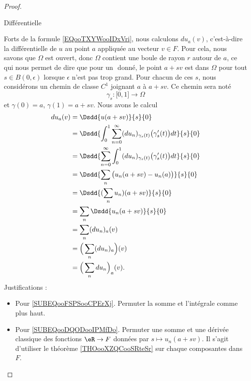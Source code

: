 \begin{proof}
\begin{subproof}
        \item[Différentielle]
        
            Forts de la formule \eqref{EQooTXYWooIDxVri}, nous calculons \( du_a(v)\), c'est-à-dire la différentielle de \( u\) au point \( a\) appliquée au vecteur \( v\in F\). Pour cela, nous savons que \( \Omega\) est ouvert, donc \( \Omega\) contient une boule de rayon \( r\) autour de \( a\), ce qui nous permet de dire que pour un \( \) donné, le point \( a+sv\) est dans \( \Omega\) pour tout \( s\in B(0,\epsilon)\) lorsque \( \epsilon\) n'est pas trop grand. Pour chacun de ces \( s\), nous considérons un chemin de classe \( C^1\) joignant \( a\) à \( a+sv\). Ce chemin sera noté
            \begin{equation}
                \gamma_s\colon \mathopen[ 0 , 1 \mathclose]\to \Omega
            \end{equation}
            et \( \gamma(0)=a\), \( \gamma(1)=a+sv\). Nous avons le calcul
            \begin{subequations}
                \begin{align}
                    du_a(v)&=\Dsdd{ u(a+sv) }{s}{0}\\
                    &=\Dsdd{ \int_0^1\sum_{n=0}^{\infty}(du_n)_{\gamma_s(t)}\big( \gamma_s'(t) \big)dt }{s}{0}\\
                    &=\Dsdd{ \sum_{n=0}^{\infty} \int_0^1(du_n)_{\gamma_s(t)}\big( \gamma'_s(t) \big)dt  }{s}{0}    \label{SUBEQooFSPSooCPErXj}\\
                    &=\Dsdd{ \sum_n\big( u_n(a+sv)-u_n(a) \big) }{s}{0}\\
                    &=\Dsdd{ (\sum_nu_n)(a+sv) }{s}{0}\\
                    &=\sum_n\Dsdd{ u_n(a+sv) }{s}{0}    \label{SUBEQooDQODooIPMfDo}\\
                    &=\sum_n(du_n)_a(v)\\
                    &=\Big( \sum_n(du_n)_a \Big)(v)\\
                    &=\Big( \sum_ndu_n \Big)_a(v)\label{SUBEQooQGOQooLvXuaX}.
                \end{align}
            \end{subequations}
            Justifications :
            \begin{itemize}
                \item Pour \ref{SUBEQooFSPSooCPErXj}. Permuter la somme et l'intégrale comme plus haut.
                \item Pour \ref{SUBEQooDQODooIPMfDo}. Permuter une somme et une dérivée classique des fonctions \( \eR\to F\) données par \( s\mapsto u_n(a+sv)\). Il s'agit d'utiliser le théorème \ref{THOooXZQCooSRteSr} sur chaque composantes dans \( F\).

\end{itemize}
\end{subproof}
\end{proof}

